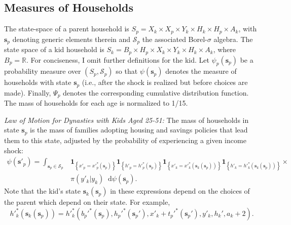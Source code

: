 \documentclass[12pt]{article}
\newcommand*\diff{\mathop{}\!\mathrm{d}}
\newcommand{\mc}{\mathcal}
\begin{document}
\subsection{Measures of Households}\label{sec:hhmeasures}
The state-space of a parent household is $S_p = X_k \times X_p \times Y_k \times H_k \times H_p  \times A_k$, with $\mathbf{s}_p$ denoting generic elements therein and $\mc{S}_p$ the associated Borel-$\sigma$ algebra. The state space of a kid household is $S_k= B_p \times H_p \times X_k \times Y_k \times H_k \times A_k$, where $B_p=\mathbb{R}$. For conciseness, I omit further definitions for the kid. Let $\psi_p(\mathbf s_p)$ be a probability measure over $(S_p,\mc{S}_p)$ so that $\psi(\mathbf s_p)$ denotes the measure of households with state $\mathbf s_p$ (i.e., after the shock is realized but before choices are made). Finally, $\Psi_p$ denotes the corresponding cumulative distribution function.  The mass of households for each age is normalized to 1/15.

\textit{Law of Motion for Dynasties with Kids Aged 25-51:} The mass of households in state $\mathbf{s}_p$ is the mass of families adopting housing and savings policies that lead them to this state, adjusted by the probability of experiencing a given income shock:
\begin{equation}\label{eq:LoM}
\begin{split}
\psi(\mathbf{s}'_p)  =  \int_{\mathbf{s}_p\in \mathcal{S}_p} & 
\mathbf{1}_{\left\{ x'_p = x'^*_p(\mathbf s_p) \right\} }
\mathbf{1}_{\left\{ h'_p = h'^*_p(\mathbf s_p) \right\} } 
\mathbf{1}_{\left\{ x'_k = x'^*_k(\mathbf s_k(\mathbf s_p))\right\}}  
\mathbf{1}_{\left\{ h'_k = h'^*_k(\mathbf s_k(\mathbf s_p))\right\}} \times \\
&\pi(y'_k|y_k)\diff \psi(\mathbf s_p).
\end{split}
\end{equation}
Note that the kid's state $\mathbf{s}_k(\mathbf{s}_p)$ in these expressions depend on the choices of the parent which depend on their state. For example, 
\begin{equation}
h'^*_k\left(\mathbf s_k(\mathbf s_p)\right) =h'^*_k\left(b_p'^*(\mathbf{s}_p),h_p'^*(\mathbf{s}_p'),x'_k + t_p'^*(\mathbf{s}_p'),y'_k,h_k',a_k+2 \right).
\end{equation}
\end{document}
